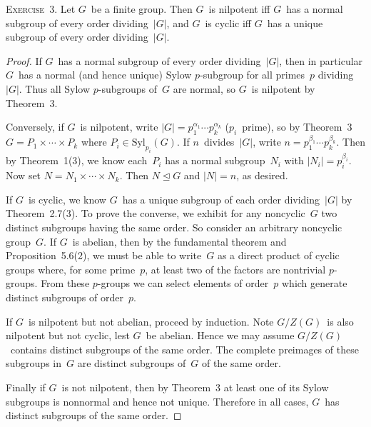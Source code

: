 \documentclass[letterpaper]{article}
\newcommand{\exercise}[1]{\goodbreak\noindent\textsc{Exercise~{#1}.}}
\newcommand{\normal}{\trianglelefteq}
\newcommand{\syl}{\mathrm{Syl}}
\newcommand{\ord}[1]{|{#1}|}
\begin{document}
\exercise{3}
Let $G$~be a finite group. Then $G$~is nilpotent iff $G$~has a normal subgroup of every order dividing~$\ord{G}$, and $G$~is cyclic iff $G$~has a unique subgroup of every order dividing~$\ord{G}$.
\begin{proof}
If $G$~has a normal subgroup of every order dividing~$\ord{G}$, then in particular $G$~has a normal (and hence unique) Sylow $p$-subgroup for all primes~$p$ dividing~$\ord{G}$. Thus all Sylow $p$-subgroups of~$G$ are normal, so $G$~is nilpotent by Theorem~3.

Conversely, if $G$~is nilpotent, write $\ord{G}=p_1^{\alpha_1}\cdots p_k^{\alpha_k}$ ($p_i$~prime), so by Theorem~3 $G=P_1\times\cdots\times P_k$ where $P_i\in\syl_{p_i}(G)$. If $n$~divides~$\ord{G}$, write $n=p_1^{\beta_1}\cdots p_k^{\beta_k}$. Then by Theorem~1(3), we know each~$P_i$ has a normal subgroup~$N_i$ with $\ord{N_i}=p_i^{\beta_i}$. Now set $N=N_1\times\cdots\times N_k$. Then $N\normal G$ and $\ord{N}=n$, as desired.

If $G$~is cyclic, we know $G$~has a unique subgroup of each order dividing~$\ord{G}$ by Theorem~2.7(3). To prove the converse, we exhibit for any noncyclic~$G$ two distinct subgroups having the same order. So consider an arbitrary noncyclic group~$G$. If $G$~is abelian, then by the fundamental theorem and Proposition~5.6(2), we must be able to write~$G$ as a direct product of cyclic groups where, for some prime~$p$, at least two of the factors are nontrivial $p$-groups. From these $p$-groups we can select elements of order~$p$ which generate distinct subgroups of order~$p$.

If $G$~is nilpotent but not abelian, proceed by induction. Note $G/Z(G)$~is also nilpotent but not cyclic, lest $G$~be abelian. Hence we may assume $G/Z(G)$~contains distinct subgroups of the same order. The complete preimages of these subgroups in~$G$ are distinct subgroups of~$G$ of the same order.

Finally if $G$~is not nilpotent, then by Theorem~3 at least one of its Sylow subgroups is nonnormal and hence not unique. Therefore in all cases, $G$~has distinct subgroups of the same order.
\end{proof}
\end{document}
